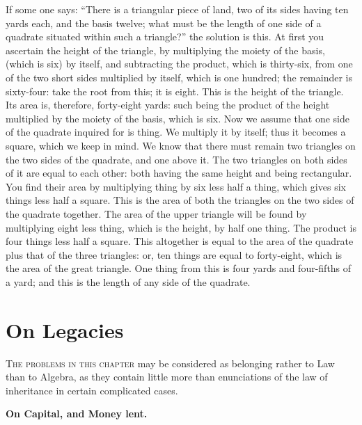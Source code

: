 If some one says: ``There is a triangular piece of land, two of its sides having ten yards each, and the basis twelve; what must be the length of one side of a quadrate situated within such a triangle?'' the solution is this. At first you ascertain the height of the triangle, by multiplying the moiety of the basis, (which is six) by itself, and subtracting the product, which is thirty-six, from one of the two short sides multiplied by itself, which is one hundred; the remainder is sixty-four: take the root from this; it is eight. This is the height of the triangle. Its area is, therefore, forty-eight yards: such being the product of the height multiplied by the moiety of the basis, which is six. Now we assume that one side of the quadrate inquired for is thing. We multiply it by itself; thus it becomes a square, which we keep in mind. We know that there must remain two triangles on the two sides of the quadrate, and one above it. The two triangles on both sides of it are equal to each other: both having the same height and being rectangular. You find their area by multiplying thing by six less half a thing, which gives six things less half a square. This is the area of both the triangles on the two sides of the quadrate together. The area of the upper triangle will be found by multiplying eight less thing, which is the height, by half one thing. The product is four things less half a square. This altogether is equal to the area of the quadrate plus that of the three triangles: or, ten things are equal to forty-eight, which is the area of the great triangle. One thing from this is four yards and four-fifths of a yard; and this is the length of any side of the quadrate.

\clearpage


\section*{On Legacies}

\lettrine{T}{he problems in this chapter} may be considered as belonging rather to Law than to Algebra, as they contain little more than enunciations of the law of inheritance in certain complicated cases.

\vspace{0.3cm}
\noindent\textbf{On Capital, and Money lent.}

